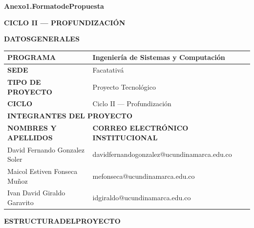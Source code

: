\documentclass[11pt]{article}
\newcommand{\formlabel}[1]{\textbf{\small #1}}
\newcommand{\formcell}[1]{\small #1}
\begin{document}
\thispagestyle{firstpage}

\vspace{0.10cm}
{\small\bfseries\hspace{0.62cm}Anexo\hspace{0.15em}1.\hspace{0.25em}Formato\hspace{0.15em}de\hspace{0.15em}Propuesta\par}
\vspace{0.20cm}
{\centering\small\bfseries CICLO II — PROFUNDIZACIÓN\par}
\vspace{0.18cm}
{\small\bfseries\hspace{0.62cm}DATOS\hspace{0.15em}GENERALES\par}
\vspace{0.12cm}

\noindent
\begin{tabular}{|p{7.55cm}|p{7.55cm}|}
\hline
\formlabel{PROGRAMA} & \formcell{Ingeniería de Sistemas y Computación} \\
\hline
\formlabel{SEDE} & \formcell{Facatativá} \\
\hline
\formlabel{TIPO DE PROYECTO} & \formcell{Proyecto Tecnológico} \\
\hline
\formlabel{CICLO} & \formcell{Ciclo II — Profundización} \\
\hline
\multicolumn{2}{|p{15.38cm}|}{\formlabel{INTEGRANTES DEL PROYECTO}} \\
\hline
\formlabel{NOMBRES Y APELLIDOS} & \formlabel{CORREO ELECTRÓNICO INSTITUCIONAL} \\
\hline
\formcell{David Fernando Gonzalez Soler} & \formcell{davidfernandogonzalez@ucundinamarca.edu.co} \\
\hline
\formcell{Maicol Estiven Fonseca Muñoz} & \formcell{mefonseca@ucundinamarca.edu.co} \\
\hline
\formcell{Ivan David Giraldo Garavito} & \formcell{idgiraldo@ucundinamarca.edu.co} \\
\hline
\end{tabular}

\vspace{0.22cm}
{\small\bfseries\hspace{0.62cm}ESTRUCTURA\hspace{0.20em}DEL\hspace{0.20em}PROYECTO\par}
\vspace{0.14cm}
\end{document}
